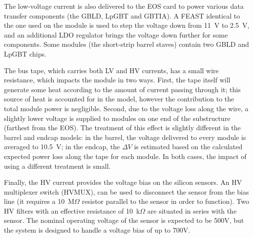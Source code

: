 The low-voltage current is also delivered to the EOS card to power various data transfer components
(the GBLD, LpGBT and GBTIA). A FEAST identical to the one used on the module is used to step the
voltage down from 11~V to 2.5~V, and an additional LDO regulator brings the voltage down further for some components.
Some modules (the short-strip barrel staves) contain two GBLD and LpGBT chips.

The bus tape, which carries both LV and HV currents, has a small wire resistance, which impacts the
module in two ways. First,
the tape itself will generate some heat according to the amount of current passing through it; this
source of heat is accounted for in the model, however the contribution to the total module power
is negligible.
Second, due to the voltage loss along the wire, a slightly lower voltage is supplied to modules on one end of the substructure (farthest from the EOS).
The treatment of this effect is slightly different in the barrel and
endcap models: in the barrel, the voltage delivered to every module is averaged to 10.5~V; in the endcap,
the $\Delta V$ is estimated based on the calculated expected power loss along the tape for each module.
In both cases, the impact of using a different treatment is small.

Finally, the HV current provides the voltage bias on the silicon sensors. An HV multiplexer
switch (HVMUX), can be used to disconnect the sensor from the
bias line (it requires a 10~M$\Omega$ resistor parallel to the sensor in order to function). Two HV filters with an effective resistance of 10~k$\Omega$ are situated in series with the
sensor. The nominal operating voltage of the sensor is expected to be 500V, but the system is designed
to handle a voltage bias of up to 700V.
